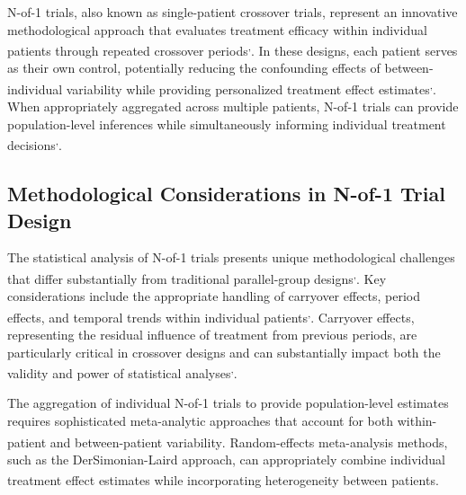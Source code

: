 \documentclass[
  11pt,
]{article}
\begin{document}
N-of-1 trials, also known as single-patient crossover trials, represent
an innovative methodological approach that evaluates treatment efficacy
within individual patients through repeated crossover
periods\textsuperscript{,}.
In these designs, each patient serves as their own control, potentially
reducing the confounding effects of between-individual variability while
providing personalized treatment effect
estimates\textsuperscript{,}.
When appropriately aggregated across multiple patients, N-of-1 trials
can provide population-level inferences while simultaneously informing
individual treatment
decisions\textsuperscript{,}.

\subsection{Methodological Considerations in N-of-1 Trial
Design}\label{methodological-considerations-in-n-of-1-trial-design}

The statistical analysis of N-of-1 trials presents unique methodological
challenges that differ substantially from traditional parallel-group
designs\textsuperscript{,}.
Key considerations include the appropriate handling of carryover
effects, period effects, and temporal trends within individual
patients\textsuperscript{,}.
Carryover effects, representing the residual influence of treatment from
previous periods, are particularly critical in crossover designs and can
substantially impact both the validity and power of statistical
analyses\textsuperscript{,}.

The aggregation of individual N-of-1 trials to provide population-level
estimates requires sophisticated meta-analytic approaches that account
for both within-patient and between-patient
variability\textsuperscript{}.
Random-effects meta-analysis methods, such as the DerSimonian-Laird
approach, can appropriately combine individual treatment effect
estimates while incorporating heterogeneity between
patients\textsuperscript{}.
\end{document}
